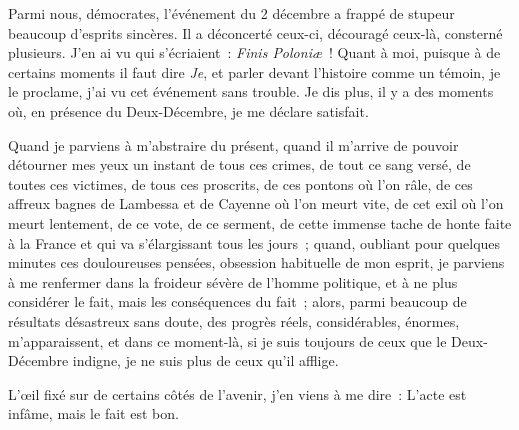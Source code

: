 \documentclass[french,twoside]{book} %
\begin{document}
\noindent Parmi nous, démocrates, l’événement du 2 décembre a frappé de stupeur beaucoup d’esprits sincères. Il a déconcerté ceux-ci, découragé ceux-là, consterné plusieurs. J’en ai vu qui s’écriaient : \emph{Finis Poloniæ} ! Quant à moi, puisque à de certains moments il faut dire \emph{Je}, et parler devant l’histoire comme un témoin, je le proclame, j’ai vu cet événement sans trouble. Je dis plus, il y a des moments où, en présence du Deux-Décembre, je me déclare satisfait.\par
Quand je parviens à m’abstraire du présent, quand il m’arrive de pouvoir détourner mes yeux un instant de tous ces crimes, de tout ce sang versé, de toutes ces victimes, de tous ces proscrits, de ces pontons où l’on râle, de ces affreux bagnes de Lambessa et de Cayenne où l’on meurt vite, de cet exil où l’on meurt lentement, de ce vote, de ce serment, de cette immense tache de honte faite à la France et qui va s’élargissant tous les jours ; quand, oubliant pour quelques minutes ces douloureuses pensées, obsession habituelle de mon esprit, je parviens à me renfermer dans la froideur sévère de l’homme politique, et à ne plus considérer le fait, mais les conséquences du fait ; alors, parmi beaucoup de résultats désastreux sans doute, des progrès réels, considérables, énormes, m’apparaissent, et dans ce moment-là, si je suis toujours de ceux que le Deux-Décembre indigne, je ne suis plus de ceux qu’il afflige.\par
L’œil fixé sur de certains côtés de l’avenir, j’en viens à me dire : L’acte est infâme, mais le fait est bon.\par
\end{document}
